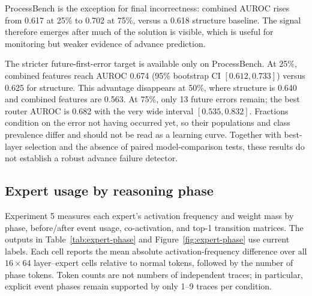 \documentclass[manuscript,screen,review]{jair}
\newcommand{\modelmetrics}[2]{\textit{Model(s):} #1. \textit{Metrics:} #2.}
\begin{document}
ProcessBench is the exception for final incorrectness: combined AUROC rises
from 0.617 at 25\% to 0.702 at 75\%, versus a 0.618 structure baseline.  The
signal therefore emerges after much of the solution is visible, which is
useful for monitoring but weaker evidence of advance prediction.

The stricter future-first-error target is available only on ProcessBench.
At 25\%, combined features reach AUROC 0.674 (95\% bootstrap CI
$[0.612,0.733]$) versus 0.625 for structure.  This advantage disappears at
50\%, where structure is 0.640 and combined features are 0.563.  At 75\%,
only 13 future errors remain; the best router AUROC is 0.682 with the very
wide interval $[0.535,0.832]$.  Fractions condition on the error not having
occurred yet, so their populations and class prevalence differ and should
not be read as a learning curve.  Together with best-layer selection and the
absence of paired model-comparison tests, these results do not establish a
robust advance failure detector.

\subsection{Expert usage by reasoning phase}

Experiment 5 measures each expert's activation frequency and weight mass by
phase, before/after event usage, co-activation, and top-1 transition matrices.
The outputs in Table~\ref{tab:expert-phase} and Figure~\ref{fig:expert-phase}
use current labels.  Each cell reports the mean absolute activation-frequency
difference over all $16\times64$ layer--expert cells relative to normal
tokens, followed by the number of phase tokens.  Token counts are not numbers
of independent traces; in particular, explicit event phases remain supported
by only 1--9 traces per condition.

\begin{table}[t]
\centering
\caption{Expert-activation shifts relative to normal tokens. Parentheses give
phase-token counts; a dash indicates no tokens for that phase.
\modelmetrics{\texttt{allenai/OLMoE-1B-7B-0924-Instruct}}{mean absolute
activation-frequency difference from normal tokens across all
$16\times64$ layer--expert cells, plus phase-token counts}}
\label{tab:expert-phase}
\end{table}
\end{document}
